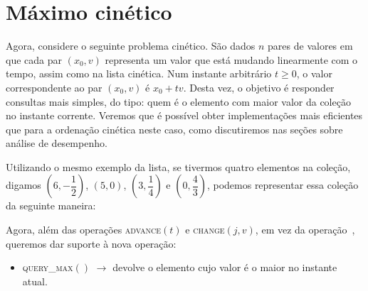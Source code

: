 
\chapter{Máximo cinético}
Agora, considere o seguinte problema cinético. São dados $n$ pares de valores em
que cada par $(x_0, v)$ representa um valor que está mudando linearmente com o
tempo, assim como na lista cinética. Num instante arbitrário $t \geq 0$, o valor
correspondente ao par $(x_0, v)$ é $x_0 + tv$. Desta vez, o objetivo é responder
consultas mais simples, do tipo: quem é o elemento com maior valor da coleção no
instante corrente. Veremos que é possível obter implementações mais eficientes
que para a ordenação cinética neste caso, como discutiremos nas seções sobre
análise de desempenho.

Utilizando o mesmo exemplo da lista, se tivermos quatro elementos na coleção,
digamos $\left(6, -\dfrac{1}{2}\right)$, $(5, 0)$, $\left(3,
\dfrac{1}{4}\right)$ e $\left(0, \dfrac{4}{3}\right)$, podemos representar essa
coleção da seguinte maneira:



Agora, além das operações \textsc{advance}$(t)$ e \textsc{change}$(j, v)$, em
vez da operação~, queremos dar suporte à nova operação:
\begin{itemize}
    \item \textsc{query\_max}$()$ $\rightarrow$ devolve o elemento cujo valor é
    o maior no instante atual.
\end{itemize}


